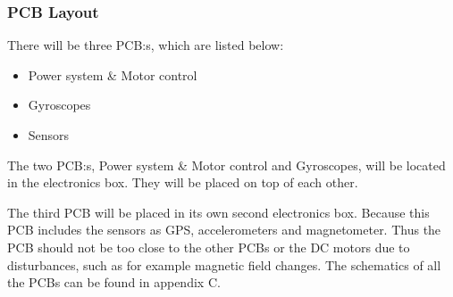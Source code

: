 \subsubsection{PCB Layout}
There will be three PCB:s, which are listed below:

\begin{itemize}
	\item 	Power system \& Motor control
	\item	Gyroscopes
	\item 	Sensors
\end{itemize}

The two PCB:s, Power system \& Motor control  and Gyroscopes, will be located in the electronics box. They will be placed on top of each other. %



The third PCB will be placed in its own second electronics box. Because this PCB includes the sensors as GPS, accelerometers and magnetometer. Thus the PCB should not be too close to the other PCBs or the DC motors due to disturbances, such as for example magnetic field changes. The schematics of all the PCBs can be found in appendix C.
\raggedbottom
